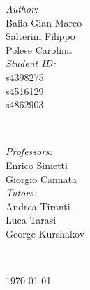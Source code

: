 \begin{titlepage}

\begin{minipage}{0.4\textwidth}
\begin{flushleft} \large
\emph{Author:}\\[0.2cm]
Balia Gian Marco \\
Salterini Filippo \\
Polese Carolina
\\[1.2em]
\emph{Student ID:}\\[0.2cm]
s4398275 \\
s4516129 \\
s4862903 
\\[1.2em]
\end{flushleft}
\end{minipage}
~
\begin{minipage}{0.4\textwidth}
\begin{flushright} \large
\emph{Professors:} \\[0.2cm]
Enrico Simetti\\
Giorgio Cannata  \\[1.2em] %

\emph{Tutors:} \\[0.2cm]
Andrea Tiranti\\
Luca Tarasi\\
George Kurshakov
\end{flushright}
\end{minipage}\\[2cm]
\makeatother



{\large \today}\\[2cm] %

\vfill %

\end{titlepage}